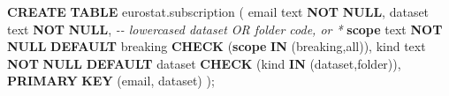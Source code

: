 \documentclass[
]{article}
\newenvironment{Shaded}{\begin{snugshade}}{\end{snugshade}}
\newcommand{\CommentTok}[1]{\textcolor[rgb]{0.56,0.35,0.01}{\textit{#1}}}
\newcommand{\KeywordTok}[1]{\textcolor[rgb]{0.13,0.29,0.53}{\textbf{#1}}}
\newcommand{\NormalTok}[1]{#1}
\newcommand{\StringTok}[1]{\textcolor[rgb]{0.31,0.60,0.02}{#1}}
\begin{document}
\begin{Shaded}
\begin{Highlighting}[]
\KeywordTok{CREATE} \KeywordTok{TABLE}\NormalTok{ eurostat.subscription (}
\NormalTok{  email   text }\KeywordTok{NOT} \KeywordTok{NULL}\NormalTok{,}
\NormalTok{  dataset text }\KeywordTok{NOT} \KeywordTok{NULL}\NormalTok{,              }\CommentTok{{-}{-} lowercased dataset OR folder code, or \textquotesingle{}*\textquotesingle{}}
  \KeywordTok{scope}\NormalTok{   text }\KeywordTok{NOT} \KeywordTok{NULL} \KeywordTok{DEFAULT} \StringTok{\textquotesingle{}breaking\textquotesingle{}} \KeywordTok{CHECK}\NormalTok{ (}\KeywordTok{scope} \KeywordTok{IN}\NormalTok{ (}\StringTok{\textquotesingle{}breaking\textquotesingle{}}\NormalTok{,}\StringTok{\textquotesingle{}all\textquotesingle{}}\NormalTok{)),}
\NormalTok{  kind    text }\KeywordTok{NOT} \KeywordTok{NULL} \KeywordTok{DEFAULT} \StringTok{\textquotesingle{}dataset\textquotesingle{}} \KeywordTok{CHECK}\NormalTok{ (kind }\KeywordTok{IN}\NormalTok{ (}\StringTok{\textquotesingle{}dataset\textquotesingle{}}\NormalTok{,}\StringTok{\textquotesingle{}folder\textquotesingle{}}\NormalTok{)),}
  \KeywordTok{PRIMARY} \KeywordTok{KEY}\NormalTok{ (email, dataset)}
\NormalTok{);}
\end{Highlighting}
\end{Shaded}
\end{document}
